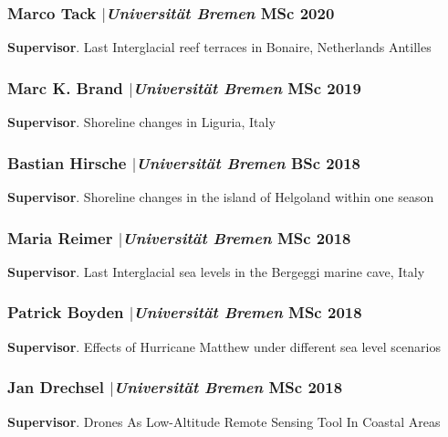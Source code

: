 \documentclass[11pt]{article}
\begin{document}
\smallskip

\subsubsection{Marco Tack $|${\normalfont\textit{Universität Bremen}} \hfill MSc 2020}
{\footnotesize 
\textbf{Supervisor}. Last Interglacial reef terraces in Bonaire, Netherlands Antilles}

\smallskip

\subsubsection{Marc K. Brand $|${\normalfont\textit{Universität Bremen}} \hfill MSc 2019}
{\footnotesize 
\textbf{Supervisor}. Shoreline changes in Liguria, Italy}

\smallskip

\subsubsection{Bastian Hirsche $|${\normalfont\textit{Universität Bremen}} \hfill BSc 2018}
{\footnotesize 
\textbf{Supervisor}. Shoreline changes in the island of Helgoland within one season}

\smallskip

\subsubsection{Maria Reimer $|${\normalfont\textit{Universität Bremen}} \hfill MSc 2018}
{\footnotesize 
\textbf{Supervisor}. Last Interglacial sea levels in the Bergeggi marine cave, Italy}

\smallskip

\subsubsection{Patrick Boyden $|${\normalfont\textit{Universität Bremen}} \hfill MSc 2018}
{\footnotesize 
\textbf{Supervisor}. Effects of Hurricane Matthew under different sea level scenarios}

\smallskip

\subsubsection{Jan Drechsel $|${\normalfont\textit{Universität Bremen}} \hfill MSc 2018}
{\footnotesize 
\textbf{Supervisor}. Drones As Low-Altitude Remote Sensing Tool In Coastal Areas}
\end{document}
